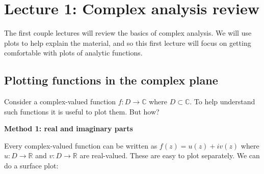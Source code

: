 \documentclass[12pt,a4paper]{article}
\begin{document}
\section{Lecture 1: Complex analysis review}
The first  couple lectures will review the basics of complex analysis. We will use plots to help explain the material, and so this first lecture will focus on getting comfortable with plots of analytic functions.

\subsection{Plotting functions in the complex plane}
Consider a complex-valued function $f : D \rightarrow {\mathbb C}$ where $D \subset {\mathbb C}$. To help understand such functions it is useful to plot them.  But how?

\textbf{Method 1: real and imaginary parts}

Every complex-valued function can be written as $f(z) = u(z) + i v(z)$ where $u : D \rightarrow {\mathbb R}$ and $v : D \rightarrow {\mathbb R}$ are real-valued. These are easy to plot separately. We can do a surface plot:
\end{document}
